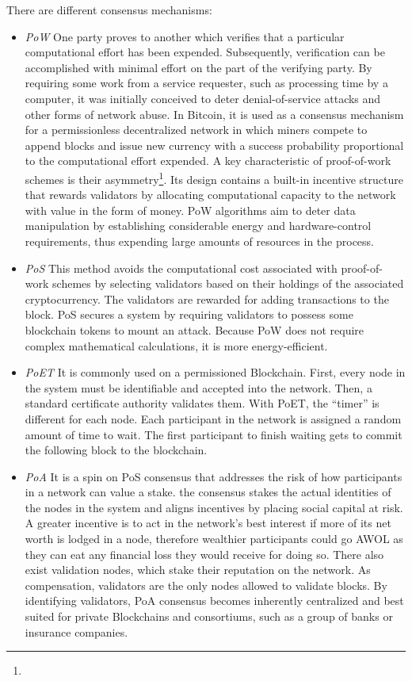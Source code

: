 There are different consensus mechanisms\cite{BlockchainConsensus:online}: 
\begin{itemize}
    \item \emph{\ac{PoW}}
    One party proves to another which verifies that a particular computational effort has been expended. Subsequently, verification can be accomplished with minimal effort on the part of the verifying party. By requiring some work from a service requester, such as processing time by a computer, it was initially conceived to deter denial-of-service attacks and other forms of network abuse. In Bitcoin, it is used as a consensus mechanism for a permissionless decentralized network in which miners compete to append blocks and issue new currency with a success probability proportional to the computational effort expended.  A key characteristic of proof-of-work schemes is their asymmetry\footnote{}. Its design contains a built-in incentive structure that rewards validators by allocating computational capacity to the network with value in the form of money.  \ac{PoW} algorithms aim to deter data manipulation by establishing considerable energy and hardware-control requirements, thus expending large amounts of resources in the process.
    
    \item \emph{\ac{PoS}}
    This method avoids the computational cost associated with proof-of-work schemes by selecting validators based on their holdings of the associated cryptocurrency. The validators are rewarded for adding transactions to the block. PoS secures a system by requiring validators to possess some blockchain tokens to mount an attack. Because PoW does not require complex mathematical calculations, it is more energy-efficient.
    
    \item \emph{\ac{PoET}}
    It is commonly used on a permissioned Blockchain. First, every node in the system must be identifiable and accepted into the network. Then, a standard certificate authority validates them. With PoET, the “timer” is different for each node. Each participant in the network is assigned a random amount of time to wait. The first participant to finish waiting gets to commit the following block to the blockchain.
    
    \item \emph{\ac{PoA}}
    It is a spin on \ac{PoS} consensus that addresses the risk of how participants in a network can value a stake. the consensus stakes the actual identities of the nodes in the system and aligns incentives by placing social capital at risk. A greater incentive is to act in the network's best interest if more of its net worth is lodged in a node, therefore  wealthier participants could go \ac{AWOL} as they can eat any financial loss they would receive for doing so. There also exist validation nodes,  which stake their reputation on the network. As compensation, validators are the only nodes allowed to validate blocks. By identifying validators, \ac{PoA} consensus becomes inherently centralized and best suited for private Blockchains and consortiums, such as a group of banks or insurance companies.


\end{itemize}
